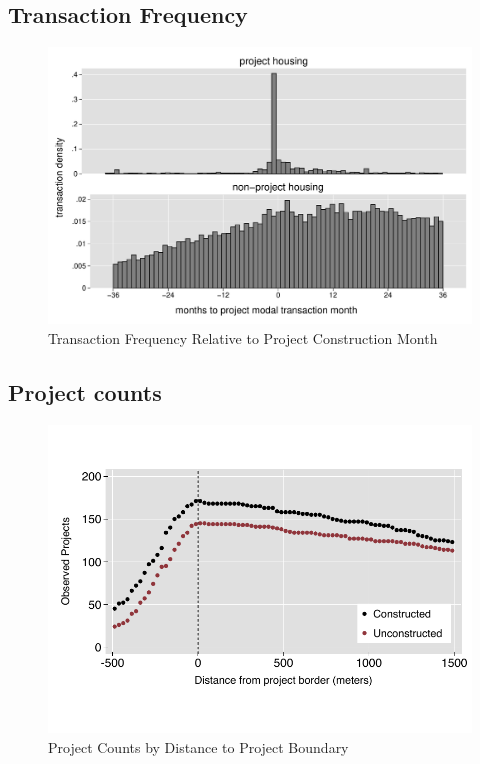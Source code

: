 \documentclass[12pt]{article}
\begin{document}
\subsection{Transaction Frequency}
\label{appendix:histfreq}
\vspace{-5mm}
\begin{figure}[ht!]
\caption{Transaction Frequency Relative to Project Construction Month}
\centering
\includegraphics[scale=.4 , trim={.2cm 0.2cm .2cm 0.2cm},clip]{figures/summary_densitytime.pdf}
\end{figure}

\subsection{Project counts}
\label{appendix:projectcounts}
\vspace{-5mm}
\begin{figure}[ht!]
\caption{Project Counts by Distance to Project Boundary}
\centering
\includegraphics[scale=1.2,trim={.1cm 1.2cm .1cm 1.2cm},clip]{figures/projectcounts_4.pdf}
\end{figure}
\end{document}
